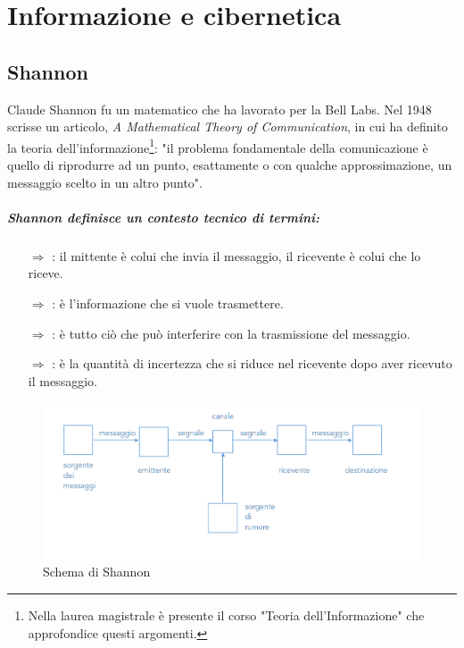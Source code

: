 \chapter{Informazione e cibernetica}

\section{Shannon}

Claude Shannon fu un matematico che ha lavorato per la Bell Labs.  Nel 1948 scrisse un articolo,
\textit{A Mathematical Theory of Communication}, in cui ha definito la teoria dell'informazione\footnote{Nella laurea magistrale è presente il corso "Teoria dell'Informazione" che approfondice questi argomenti.}: 
"il problema fondamentale della comunicazione è quello di 
riprodurre ad un punto, esattamente o con qualche approssimazione, un messaggio
scelto in un altro punto".

\paragraph{Shannon definisce un contesto tecnico di termini:}
\begin{itemize}
    \item [$\Rightarrow$] : il mittente è colui che invia il messaggio, il ricevente è colui che lo riceve.
    \item [$\Rightarrow$] : è l'informazione che si vuole trasmettere.
    \item [$\Rightarrow$] : è tutto ciò che può interferire con la trasmissione del messaggio.
    \item [$\Rightarrow$] : è la quantità di incertezza che si riduce nel ricevente dopo aver ricevuto il messaggio.
\end{itemize}



\begin{figure}[h]
    \centering
    \includegraphics[scale=0.35]{images/Shannon.png}
    \caption{Schema di Shannon}
\end{figure}

